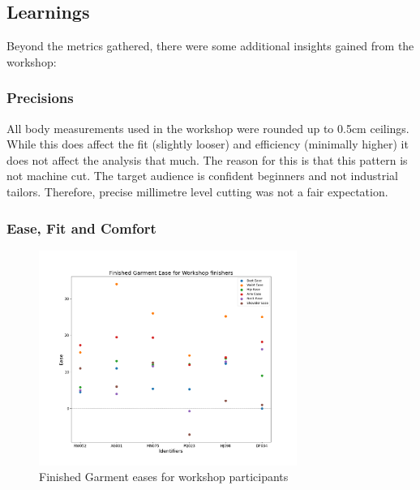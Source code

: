\subsection{Learnings}
Beyond the metrics gathered, there were some additional insights gained from the workshop:
\subsubsection{Precisions}
All body measurements used in the workshop were rounded up to 0.5cm ceilings. While this does affect the fit (slightly looser) and efficiency (minimally higher) it does not affect the analysis that much. The reason for this is that this pattern is not machine cut. The target audience is confident beginners and not industrial tailors. Therefore, precise millimetre level cutting was not a fair expectation.

\subsubsection{Ease, Fit and Comfort}
\begin{figure} [H] %
    \centering %
    \includegraphics[width = 0.75\textwidth]{Images/FG_Ease_Plot.png} %
    \caption{Finished Garment eases for workshop participants}
\end{figure}

